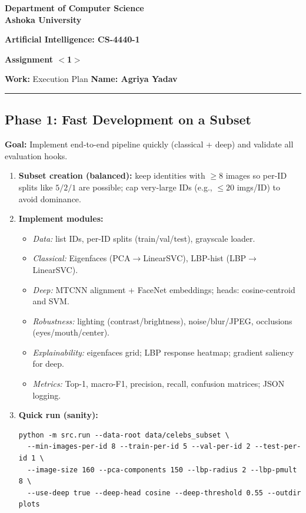 \documentclass[a4paper]{article}
\begin{document}
\begin{center}
{\large \bf \color{red}  Department of Computer Science} \\
{\large \bf \color{red}  Ashoka University} \\

\vspace{0.1in}

{\large \bf \color{blue}  Artificial Intelligence: CS-4440-1}

\vspace{0.05in}

    { \bf \color{YellowOrange} Assignment{ $<$1$>$}}
\end{center}
\medskip

{\textbf{Work:} Execution Plan} \hfill {\textbf{Name: Agriya Yadav} }

\bigskip
\hrule


\subsection*{Phase 1: Fast Development on a Subset}
\textbf{Goal:} Implement end-to-end pipeline quickly (classical + deep) and validate all evaluation hooks.
\begin{enumerate}
  \item \textbf{Subset creation (balanced):} keep identities with $\geq 8$ images so per-ID splits like $5/2/1$ are possible; cap very-large IDs (e.g., $\leq 20$ imgs/ID) to avoid dominance.
  \item \textbf{Implement modules:}
  \begin{itemize}
    \item \emph{Data:} list IDs, per-ID splits (train/val/test), grayscale loader.
    \item \emph{Classical:} Eigenfaces (PCA$\to$LinearSVC), LBP-hist (LBP$\to$LinearSVC).
    \item \emph{Deep:} MTCNN alignment + FaceNet embeddings; heads: cosine-centroid and SVM.
    \item \emph{Robustness:} lighting (contrast/brightness), noise/blur/JPEG, occlusions (eyes/mouth/center).
    \item \emph{Explainability:} eigenfaces grid; LBP response heatmap; gradient saliency for deep.
    \item \emph{Metrics:} Top-1, macro-F1, precision, recall, confusion matrices; JSON logging.
  \end{itemize}
  \item \textbf{Quick run (sanity):}
\begin{verbatim}
python -m src.run --data-root data/celebs_subset \
  --min-images-per-id 8 --train-per-id 5 --val-per-id 2 --test-per-id 1 \
  --image-size 160 --pca-components 150 --lbp-radius 2 --lbp-pmult 8 \
  --use-deep true --deep-head cosine --deep-threshold 0.55 --outdir plots
\end{verbatim}
\end{enumerate}
\end{document}
